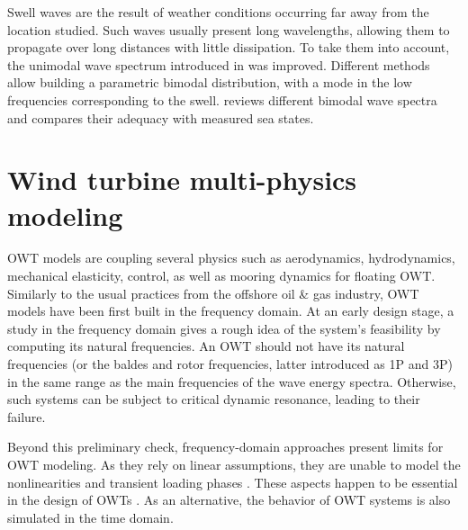 Swell waves are the result of weather conditions occurring far away from the location studied. 
Such waves usually present long wavelengths, allowing them to propagate over long distances with little dissipation. 
To take them into account, the unimodal wave spectrum introduced in  was improved. 
Different methods allow building a parametric bimodal distribution, with a mode in the low frequencies corresponding to the swell. 
\citet{guedes_2005_bimodal_jonswap} reviews different bimodal wave spectra and compares their adequacy with measured sea states. 



\section{Wind turbine multi-physics modeling} \label{sec:owt_modeling}

OWT models are coupling several physics such as aerodynamics, hydrodynamics, mechanical elasticity, control, as well as mooring dynamics for floating OWT. 
Similarly to the usual practices from the offshore oil \& gas industry, OWT models have been first built in the frequency domain. 
At an early design stage, a study in the frequency domain gives a rough idea of the system's feasibility by computing its natural frequencies. 
An OWT should not have its natural frequencies (or the baldes and rotor frequencies, latter introduced as 1P and 3P) in the same range as the main frequencies of the wave energy spectra. 
Otherwise, such systems can be subject to critical dynamic resonance, leading to their failure.

Beyond this preliminary check, frequency-domain approaches present limits for OWT modeling. 
As they rely on linear assumptions, they are unable to model the nonlinearities and transient loading phases \citep{matha_2011_ISOPE}. 
These aspects happen to be essential in the design of OWTs \citep{jonkman_2011_ISOPE}. 
As an alternative, the behavior of OWT systems is also simulated in the time domain. 

